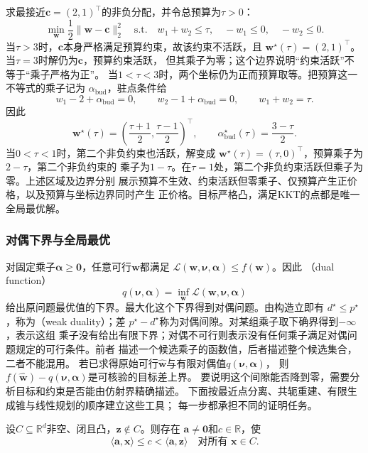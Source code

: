 \begin{example}
\label{ex:opt-kkt-budget}
求最接近$\bm{c}=(2,1)^{\top}$的非负分配，并令总预算为$\tau>0$：
\[
  \min_{\bm{w}}\frac12\lVert\bm{w}-\bm{c}\rVert_2^2
  \quad\text{s.t.}\quad
  w_1+w_2\leq\tau,\quad -w_1\leq0,\quad -w_2\leq0.
\]
当$\tau>3$时，$\bm{c}$本身严格满足预算约束，故该约束不活跃，且
$\bm{w}^{\star}(\tau)=(2,1)^{\top}$。当$\tau=3$时解仍为$\bm{c}$，预算约束活跃，
但其乘子为零；这个边界说明“约束活跃”不等于“乘子严格为正”。
当$1<\tau<3$时，两个坐标仍为正而预算取等。把预算这一不等式的乘子记为
$\alpha_{\mathrm{bud}}$，驻点条件给
\[
  w_1-2+\alpha_{\mathrm{bud}}=0,\qquad
  w_2-1+\alpha_{\mathrm{bud}}=0,\qquad
  w_1+w_2=\tau.
\]
因此
\[
  \bm{w}^{\star}(\tau)
  =\left(\frac{\tau+1}{2},\frac{\tau-1}{2}\right)^{\top},
  \qquad
  \alpha_{\mathrm{bud}}^{\star}(\tau)=\frac{3-\tau}{2}.
\]
当$0<\tau<1$时，第二个非负约束也活跃，解变成
$\bm{w}^{\star}(\tau)=(\tau,0)^{\top}$，预算乘子为$2-\tau$，第二个非负约束的
乘子为$1-\tau$。在$\tau=1$处，第二个非负约束活跃但乘子为零。上述区域及边界分别
展示预算不生效、约束活跃但零乘子、仅预算产生正价格，以及预算与坐标边界同时产生
正价格。目标严格凸，满足KKT的点都是唯一全局最优解。
\end{example}

\subsubsection{对偶下界与全局最优}
\label{sec:opt-duality}
\label{sec:opt-affine-certificates}

对固定乘子$\bm{\alpha}\geq\bm{0}$，任意可行$\bm{w}$都满足
$\mathcal{L}(\bm{w},\bm{\nu},\bm{\alpha})\leq f(\bm{w})$。因此
（dual function）
\[
  q(\bm{\nu},\bm{\alpha})
  =\inf_{\bm{w}}\mathcal{L}(\bm{w},\bm{\nu},\bm{\alpha})
\]
给出原问题最优值的下界。最大化这个下界得到对偶问题。由构造立即有
$d^{\star}\leq p^{\star}$，称为（weak duality）；差
$p^{\star}-d^{\star}$称为对偶间隙。对某组乘子取下确界得到$-\infty$，表示这组
乘子没有给出有限下界；对偶不可行则表示没有任何乘子满足对偶问题规定的可行条件。前者
描述一个候选乘子的函数值，后者描述整个候选集合，二者不能混用。
若已求得原始可行$\widehat{\bm w}$与有限对偶值$q(\bm\nu,\bm\alpha)$，
则$f(\widehat{\bm w})-q(\bm\nu,\bm\alpha)$是可核验的目标差上界。
要说明这个间隙能否降到零，需要分析目标和约束是否能由仿射界精确描述。
下面按最近点分离、共轭重建、有限生成锥与线性规划的顺序建立这些工具；
每一步都承担不同的证明任务。

\begin{theorem}[闭凸集外一点的严格分离]
\label{thm:opt-projection-separation}
设$C\subseteq\mathbb{R}^d$非空、闭且凸，$\bm{z}\notin C$。则存在
$\bm{a}\neq\bm{0}$和$c\in\mathbb{R}$，使
\[
  \langle\bm{a},\bm{x}\rangle\leq c
  <\langle\bm{a},\bm{z}\rangle
  \quad\text{对所有 }\bm{x}\in C.
\]
\end{theorem}

